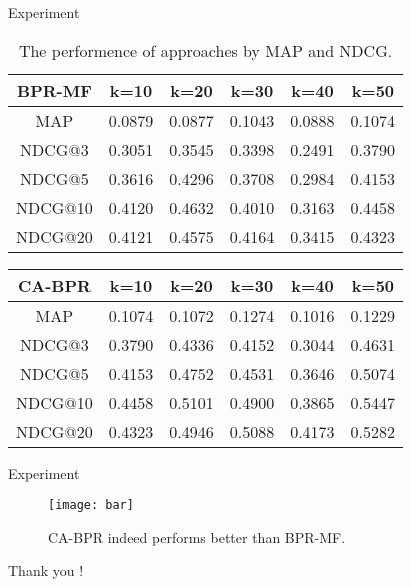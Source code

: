 \begin{frame}{Experiment}
	\begin{table}[htbp]
		\caption{The performence of approaches by MAP and NDCG.}
		\label{tab:mapandndcg}
		\begin{center}
			\begin{tabular}{|c | c |c |c|c|c|}
				\hline
				BPR-MF  &   k=10 &   k=20 &    k=30&    k=40&    k=50\\
				\hline
				MAP      &  0.0879&  0.0877&  0.1043&  0.0888&  0.1074\\
				\hline
				NDCG@3   &  0.3051&  0.3545&  0.3398&  0.2491&  0.3790\\
				NDCG@5   &  0.3616&  0.4296&  0.3708&  0.2984&  0.4153\\
				NDCG@10  &  0.4120&  0.4632&  0.4010&  0.3163&  0.4458\\
				NDCG@20  &  0.4121&  0.4575&  0.4164&  0.3415&  0.4323\\
				\hline
			\end{tabular}
		\end{center}
	\end{table}
	
	\begin{table}
		
		\begin{center}
			
			\begin{tabular}{|c | c |c |c|c|c|}
				\hline
				CA-BPR  &     k=10&   k=20 &    k=30&  k=40 &   k=50  \\
				\hline
				MAP     &   0.1074&  0.1072&  0.1274&  0.1016&  0.1229\\
				\hline
				NDCG@3  &   0.3790&  0.4336&  0.4152&  0.3044&  0.4631\\
				NDCG@5  &   0.4153&  0.4752&  0.4531&  0.3646&  0.5074\\
				NDCG@10 &   0.4458&  0.5101&  0.4900&  0.3865&  0.5447\\
				NDCG@20 &   0.4323&  0.4946&  0.5088&  0.4173&  0.5282\\
				\hline
			\end{tabular}
		\end{center}
	\end{table}
\end{frame}

\begin{frame}{Experiment}
	\begin{figure}
		\begin{center}
			\texttt{[image: bar]}
		\end{center}
		\caption{CA-BPR indeed performs better than BPR-MF.}
	\end{figure}
\end{frame}

\begin{frame}
	\centering
	\Huge Thank you !
\end{frame}
